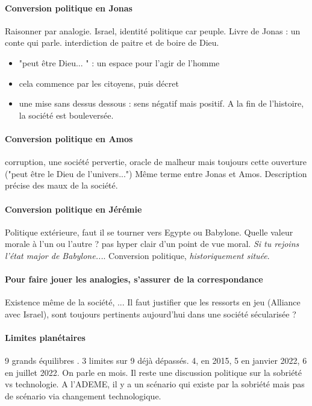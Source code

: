 \paragraph{Conversion politique en Jonas} Raisonner par analogie. Israel, identité politique car peuple. Livre de Jonas : un conte qui parle. interdiction de paitre et de boire de Dieu. 

\begin{itemize}
    \item "peut être Dieu... " : un espace pour l'agir de l'homme
    \item cela commence par les citoyens, puis décret
    \item une mise sans dessus dessous : sens négatif mais positif. A la fin de l'histoire, la société est bouleversée.
\end{itemize}

\paragraph{Conversion politique en Amos} corruption, une société pervertie, oracle de malheur mais toujours cette ouverture ("peut être le Dieu de l'univers...") Même terme entre Jonas et Amos. Description précise des maux de la société.

\paragraph{Conversion politique en Jérémie} Politique extérieure, faut il se tourner vers Egypte ou Babylone. Quelle valeur morale à l'un ou l'autre ? pas hyper clair d'un point de vue moral. \textit{Si tu rejoins l'état major de Babylone...}. Conversion politique, \textit{historiquement située}.

\paragraph{Pour faire jouer les analogies, s'assurer de la correspondance} Existence même de la société, ... Il faut justifier que les ressorts en jeu (Alliance avec Israel), sont toujours pertinents aujourd'hui dans une société sécularisée ?

\paragraph{Limites planétaires} 9 grands équilibres . 3 limites sur 9 déjà dépassés. 4, en 2015, 5 en janvier 2022, 6 en juillet 2022. On parle en mois. 
Il reste une discussion politique sur la sobriété vs technologie. A l'ADEME, il y a un scénario qui existe par la sobriété mais pas de scénario via changement technologique. 

